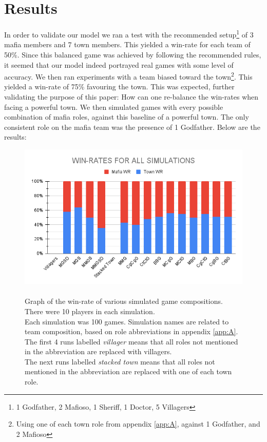 \section{Results}\label{sec:results}
In order to validate our model we ran a test with the recommended
setup\footnote[1]{1 Godfather, 2 Mafioso, 1 Sheriff, 1 Doctor, 5 Villagers} of
3 mafia members and 7 town members\cite{MafiaRules}. This yielded a win-rate
for each team of 50\%. Since this balanced game was achieved by following the
recommended rules, it seemed that our model indeed portrayed real games with
some level of accuracy. We then ran experiments with a team biased toward the
town\footnote{Using one of each town role from appendix \ref{app:A}, against 1
    Godfather, and 2 Mafioso}. This yielded a win-rate of 75\% favouring the town.
This was expected, further validating the purpose of this paper: How can one
re-balance the win-rates when facing a powerful town. We then simulated games
with every possible combination of mafia roles, against this baseline of a
powerful town. The only consistent role on the mafia team was the presence of 1
Godfather. Below are the results:
\begin{figure}[h]
    \includegraphics[width=1\linewidth]{figures/Winrates}
    \caption{\\Graph of the win-rate of various simulated game compositions.\\
        There were 10 players in each simulation.\\
        Each simulation was 100 games.
        Simulation names are related to team composition, based on role
        abbreviations in appendix \ref{app:A}.\\
        The first 4 runs labelled \textit{villager} means that all roles not
        mentioned in the abbreviation are replaced with villagers.\\
        The next runs labelled \textit{stacked town} means that all roles not
        mentioned in the abbreviation are replaced with	one of each town role.}
    \label{fig:placeholder}
\end{figure}
